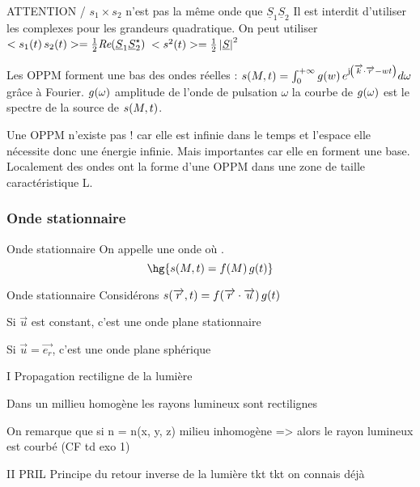 \documentclass[a4paper,french,bookmarks]{book}
\begin{document}
\begin{psse}
    ATTENTION / $s_1 \times s_2$ n'est pas la même onde que $\underline S_1 \underline S_2$
    Il est interdit d'utiliser les complexes pour les grandeurs quadratique. On peut utiliser $<s_1\!\left(t\right)s_2\!\left(t\right)> = \frac{1}{2}\textit{Re}\!\left(\underline S_1 \underline S_2^\star\right)$
    $<s^2\!\left(t\right)> = \frac{1}{2} \left\lvert\underline S\right\rvert^2$
        \item Les OPPM forment une bas des ondes réelles :
    $s\!\left(M, t\right) = \int_0^{+\infty} g\!\left(w\right) e^{\mathrm{j\mkern1mu} \!\left(\overrightarrow{k} \cdot \overrightarrow{r} - wt\right)}d\omega$ grâce à Fourier.
    $g\!\left(\omega\right)$ amplitude de l'onde de pulsation $\omega$ la courbe de $g\!\left(\omega\right)$ est le spectre de la source de $s\!\left(M,t\right)$.
        \item Une OPPM n'existe pas !
    car elle est infinie dans le temps et l'espace elle nécessite donc une énergie infinie.
    Mais importantes car elle en forment une base.
    Localement des ondes ont la forme d'une OPPM dans une zone de taille caractéristique L.
    \end{psse}
    
    \subsubsection{Onde stationnaire}
    
    \begin{definition}{Onde stationnaire}{}
        On appelle  une onde où .
        \[ \hg{s\p{M, t} = f\p{M}g\p{t}}\]
    \end{definition}
    
    \begin{example}{Onde stationnaire}{}
        Considérons $s\!\left(\overrightarrow{r}, t\right) = f\!\left(\overrightarrow{r} \cdot \overrightarrow{u}\right)g\!\left(t\right)$
        \begin{enumerate}
            \itt Si $\vec u$ est constant, c'est une onde plane stationnaire
            
            \itt Si $\vec u = \vec{e_r}$, c'est une onde plane sphérique
        \end{enumerate}
    \end{example}

    I Propagation rectiligne de la lumière

    Dans un millieu homogène les rayons lumineux sont rectilignes

    On remarque que si n = n(x, y, z) milieu inhomogène => alors le rayon lumineux est courbé (CF td exo 1)

    II PRIL
    Principe du retour inverse de la lumière
    tkt tkt on connais déjà
\end{document}
